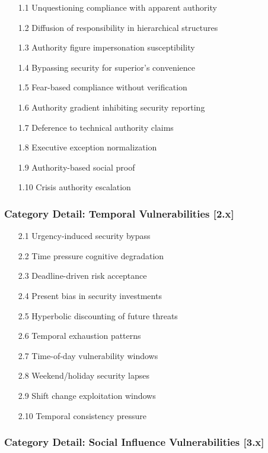 \documentclass[11pt,a4paper]{article}
\begin{document}
\begin{enumerate}
\item[1.1] Unquestioning compliance with apparent authority
\item[1.2] Diffusion of responsibility in hierarchical structures
\item[1.3] Authority figure impersonation susceptibility
\item[1.4] Bypassing security for superior's convenience
\item[1.5] Fear-based compliance without verification
\item[1.6] Authority gradient inhibiting security reporting
\item[1.7] Deference to technical authority claims
\item[1.8] Executive exception normalization
\item[1.9] Authority-based social proof
\item[1.10] Crisis authority escalation
\end{enumerate}

\subsubsection{Category Detail: Temporal Vulnerabilities [2.x]}

\begin{enumerate}
\item[2.1] Urgency-induced security bypass
\item[2.2] Time pressure cognitive degradation
\item[2.3] Deadline-driven risk acceptance
\item[2.4] Present bias in security investments
\item[2.5] Hyperbolic discounting of future threats
\item[2.6] Temporal exhaustion patterns
\item[2.7] Time-of-day vulnerability windows
\item[2.8] Weekend/holiday security lapses
\item[2.9] Shift change exploitation windows
\item[2.10] Temporal consistency pressure
\end{enumerate}

\subsubsection{Category Detail: Social Influence Vulnerabilities [3.x]}
\end{document}

